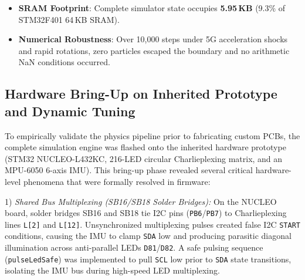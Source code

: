 \documentclass[conference]{IEEEtran}
\begin{document}
\begin{table}[htbp]
\caption{Simulation Performance across Fluid Fill Levels}
\label{tab:benchmarks}
\centering
{}
\end{table}

\begin{itemize}
    \item \textbf{SRAM Footprint}: Complete simulator state occupies \textbf{5.95\,KB} (9.3\% of STM32F401 64\,KB SRAM).
    \item \textbf{Numerical Robustness}: Over 10,000 steps under 5G acceleration shocks and rapid rotations, zero particles escaped the boundary and no arithmetic NaN conditions occurred.
\end{itemize}

\subsection{Hardware Bring-Up on Inherited Prototype and Dynamic Tuning}
To empirically validate the physics pipeline prior to fabricating custom PCBs, the complete simulation engine was flashed onto the inherited hardware prototype (STM32 NUCLEO-L432KC, 216-LED circular Charlieplexing matrix, and an MPU-6050 6-axis IMU). This bring-up phase revealed several critical hardware-level phenomena that were formally resolved in firmware:

1) \emph{Shared Bus Multiplexing (SB16/SB18 Solder Bridges):} On the NUCLEO board, solder bridges SB16 and SB18 tie I2C pins (\texttt{PB6}/\texttt{PB7}) to Charlieplexing lines \texttt{L[2]} and \texttt{L[12]}. Unsynchronized multiplexing pulses created false I2C \texttt{START} conditions, causing the IMU to clamp \texttt{SDA} low and producing parasitic diagonal illumination across anti-parallel LEDs \texttt{D81}/\texttt{D82}. A safe pulsing sequence (\texttt{pulseLedSafe}) was implemented to pull \texttt{SCL} low prior to \texttt{SDA} state transitions, isolating the IMU bus during high-speed LED multiplexing.
\end{document}
